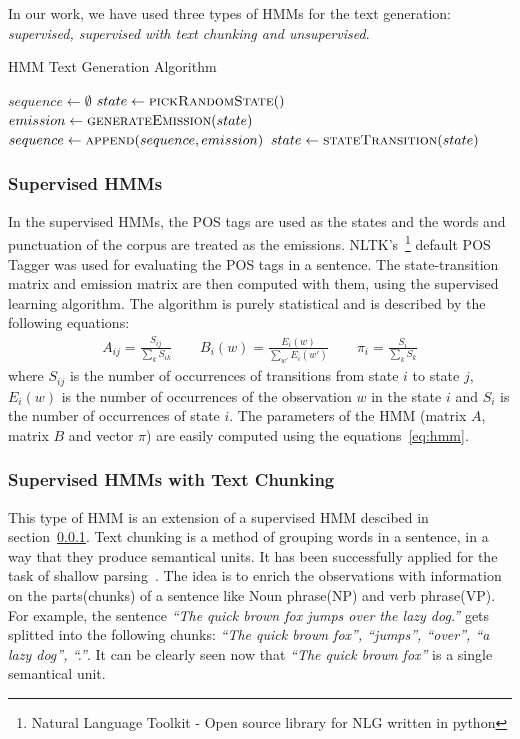 \documentclass[a4paper,12pt]{article}
\begin{document}
In our work, we have used three types of HMMs for the text generation:
\textit{supervised, supervised with text chunking and unsupervised}.

\begin{algorithm}
\caption{HMM Text Generation Algorithm}
\label{alg:hmm}
\begin{algorithmic}[1]
	\State $sequence \gets \emptyset$
	\State $state \gets \Call{pickRandomState}$
	\Repeat
		\State $emission \gets \Call{generateEmission}{state}$
		\State $sequence \gets \Call{append}{sequence, emission}$
		\State $state \gets \Call{stateTransition}{state}$
	 \\
\end{algorithmic}
\end{algorithm}

\subsubsection{Supervised HMMs}
\label{sec:suphmm}
In the supervised HMMs, the POS tags are used as the states and the words and
punctuation of the corpus are treated as the emissions. NLTK's~\footnote{Natural
Language Toolkit - Open source library for NLG written in python} default POS Tagger was
used for evaluating the POS tags in a sentence. The state-transition matrix and
emission matrix are then computed with them, using the supervised learning
algorithm. The algorithm is purely statistical and is described by the
following equations:
\begin{align}
\label{eq:hmm}
A_{ij} = \frac{S_{ij}}{\sum_{k} S_{ik}} \qquad
B_{i}(w) = \frac{E_{i}(w)}{\sum_{w'} E_{i}(w')} \qquad
\pi_{i} = \frac{S_{i}}{\sum_{k} S_{k}}
\end{align}
where $S_{ij}$ is the number of occurrences of transitions from state $i$ to
state $j$, $E_{i}(w)$ is the number of occurrences of the observation $w$ in the
state $i$ and $S_{i}$ is the number of occurrences of state $i$. The
parameters of the HMM (matrix $A$, matrix $B$ and vector $\pi$) are easily
computed using the equations~\ref{eq:hmm}.

\subsubsection{Supervised HMMs with Text Chunking}
This type of HMM is an extension of a supervised HMM descibed in
section~\ref{sec:suphmm}. Text chunking is a method of grouping words in a
sentence, in a way that they produce semantical units. It has been successfully 
applied for the task of shallow parsing~\cite{hmmchunk}. The idea is to enrich the
observations with information on the parts(chunks) of a sentence like Noun phrase(NP)
and verb phrase(VP). For example, the sentence
\textit{``The quick brown fox jumps over the lazy dog.''} gets splitted into the
following chunks: \textit{``The quick brown fox'', ``jumps'', ``over'', ``a lazy
dog'', ``.''}. It can be clearly seen now that \textit{``The quick brown fox''}
is a single semantical unit.
\end{document}
